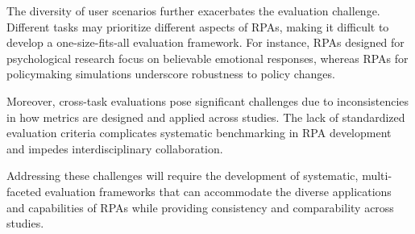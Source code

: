 
The diversity of user scenarios further exacerbates the evaluation challenge. 
Different tasks may prioritize different aspects of RPAs, making it difficult to develop a one-size-fits-all evaluation framework.
For instance, RPAs designed for psychological research focus on believable emotional responses, whereas RPAs for policymaking simulations underscore robustness to policy changes.


Moreover, cross-task evaluations pose significant challenges due to inconsistencies in how metrics are designed and applied across studies. 
The lack of standardized evaluation criteria complicates systematic benchmarking in RPA development and impedes interdisciplinary collaboration.

Addressing these challenges will require the development of systematic, multi-faceted evaluation frameworks that can accommodate the diverse applications and capabilities of RPAs while providing consistency and comparability across studies.




